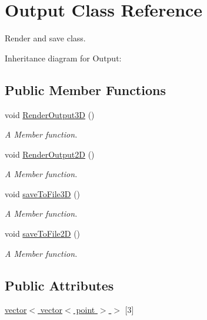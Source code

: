 \hypertarget{classOutput}{}\section{Output Class Reference}
\label{classOutput}


Render and save class.  




Inheritance diagram for Output\+:
\subsection*{Public Member Functions}
\begin{DoxyCompactItemize}
\item 
void \hyperlink{classOutput_a50c6da843dbf27d6238ed07082b31839}{Render\+Output3D} ()
\begin{DoxyCompactList}\small\item\em A Member function. \end{DoxyCompactList}\item 
void \hyperlink{classOutput_a9766c258cad838c5779e0abc778a530d}{Render\+Output2D} ()
\begin{DoxyCompactList}\small\item\em A Member function. \end{DoxyCompactList}\item 
void \hyperlink{classOutput_aa16a2893d743f7c218c026efa3e65718}{save\+To\+File3D} ()
\begin{DoxyCompactList}\small\item\em A Member function. \end{DoxyCompactList}\item 
void \hyperlink{classOutput_aa9ea0df4774ce32a319bdb1b3a6712a8}{save\+To\+File2D} ()
\begin{DoxyCompactList}\small\item\em A Member function. \end{DoxyCompactList}\end{DoxyCompactItemize}
\subsection*{Public Attributes}
\begin{DoxyCompactItemize}
\item 
\hyperlink{classOutput_a108ca6c08cfc8a442fac5f1dc864a481}{vector$<$ vector$<$ point $>$ $>$} \mbox{[}3\mbox{]}
\end{DoxyCompactItemize}



